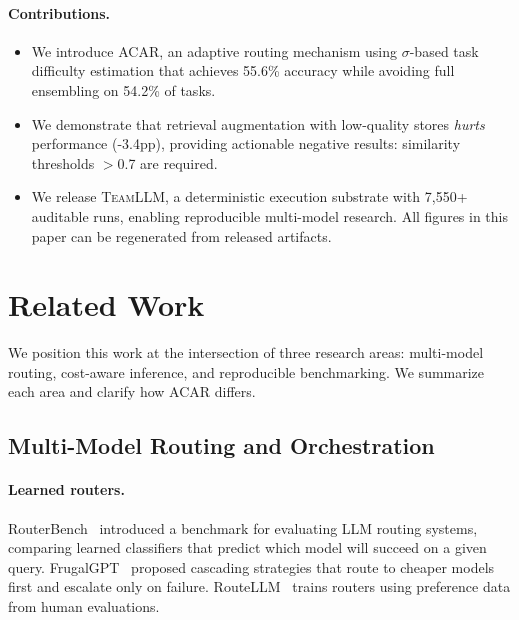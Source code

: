 \documentclass{article}
\newcommand{\acar}{\textsc{ACAR}}
\newcommand{\teamllm}{\textsc{TeamLLM}}
\begin{document}
\paragraph{Contributions.}
\begin{itemize}[leftmargin=*, itemsep=2pt, topsep=0pt]
    \item We introduce \acar{}, an adaptive routing mechanism using $\sigma$-based task difficulty estimation that achieves 55.6\% accuracy while avoiding full ensembling on 54.2\% of tasks.
    \item We demonstrate that retrieval augmentation with low-quality stores \emph{hurts} performance (-3.4pp), providing actionable negative results: similarity thresholds $>$0.7 are required.
    \item We release \teamllm{}, a deterministic execution substrate with 7,550+ auditable runs, enabling reproducible multi-model research. All figures in this paper can be regenerated from released artifacts.
\end{itemize}

\section{Related Work}

We position this work at the intersection of three research areas: multi-model routing, cost-aware inference, and reproducible benchmarking. We summarize each area and clarify how \acar{} differs.

\subsection{Multi-Model Routing and Orchestration}

\paragraph{Learned routers.}
RouterBench~\citep{routerbench} introduced a benchmark for evaluating LLM routing systems, comparing learned classifiers that predict which model will succeed on a given query. FrugalGPT~\citep{frugalgpt} proposed cascading strategies that route to cheaper models first and escalate only on failure. RouteLLM~\citep{routellm} trains routers using preference data from human evaluations.
\end{document}
